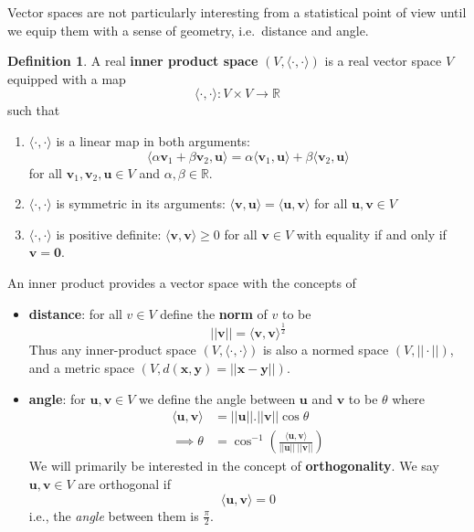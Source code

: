 \documentclass[
]{book}
\providecommand{\tightlist}{%
  \setlength{\itemsep}{0pt}\setlength{\parskip}{0pt}}
\theoremstyle{definition}
\newtheorem{definition}{Definition}[chapter]
\theoremstyle{definition}
\theoremstyle{definition}
\theoremstyle{definition}
\theoremstyle{remark}
\begin{document}
Vector spaces are not particularly interesting from a statistical point of view until we equip them with a sense of geometry, i.e.~distance and angle.

\begin{definition}
\protect\hypertarget{def:innerprod}{}\label{def:innerprod}A real \textbf{inner product space} \((V, \langle\cdot,\cdot\rangle)\) is a real vector space \(V\) equipped with a map
\[ \langle\cdot,\cdot\rangle : V \times V \rightarrow \mathbb{R}\]
such that
\end{definition}

\begin{enumerate}
\def\labelenumi{\arabic{enumi}.}
\tightlist
\item
  \(\langle\cdot,\cdot\rangle\) is a linear map in both arguments:
  \[\langle \alpha \mathbf v_1+\beta \mathbf v_2, \mathbf u\rangle = \alpha \langle \mathbf v_1, \mathbf u\rangle + \beta \langle \mathbf v_2, \mathbf u\rangle\]
  for all \(\mathbf v_1, \mathbf v_2, \mathbf u\in V\) and \(\alpha, \beta \in \mathbb{R}\).
\item
  \(\langle\cdot,\cdot\rangle\) is symmetric in its arguments: \(\langle \mathbf v, \mathbf u\rangle = \langle \mathbf u, \mathbf v\rangle\) for all \(\mathbf u,\mathbf v\in V\)
\item
  \(\langle\cdot,\cdot\rangle\) is positive definite: \(\langle \mathbf v, \mathbf v\rangle \geq 0\) for all \(\mathbf v\in V\) with equality if and only if \(\mathbf v={\mathbf 0}\).
\end{enumerate}

An inner product provides a vector space with the concepts of

\begin{itemize}
\item
  \textbf{distance}: for all \(v\in V\) define the \textbf{norm} of \(v\) to be \[||\mathbf v|| = \langle \mathbf v, \mathbf v\rangle ^{\frac{1}{2}}\]
  Thus any inner-product space \((V, \langle\cdot,\cdot\rangle)\) is also a normed space \((V, ||\cdot||)\), and a metric space \((V, d(\mathbf x,\mathbf y)=||\mathbf x-\mathbf y||)\).
\item
  \textbf{angle}: for \(\mathbf u, \mathbf v\in V\) we define the angle between \(\mathbf u\) and \(\mathbf v\) to be \(\theta\) where
  \begin{align*}
  \langle \mathbf u,\mathbf v\rangle &= ||\mathbf u||.||\mathbf v||\cos \theta\\
  \implies \theta &= \cos^{-1}\left( \frac{\langle \mathbf u, \mathbf v\rangle}{||\mathbf u|| \;||\mathbf v||}\right)
  \end{align*}
  We will primarily be interested in the concept of \textbf{orthogonality}. We say \(\mathbf u, \mathbf v\in V\) are orthogonal if
  \[\langle \mathbf u, \mathbf v\rangle =0\]
  i.e., the \emph{angle} between them is \(\frac{\pi}{2}\).
\end{itemize}
\end{document}
